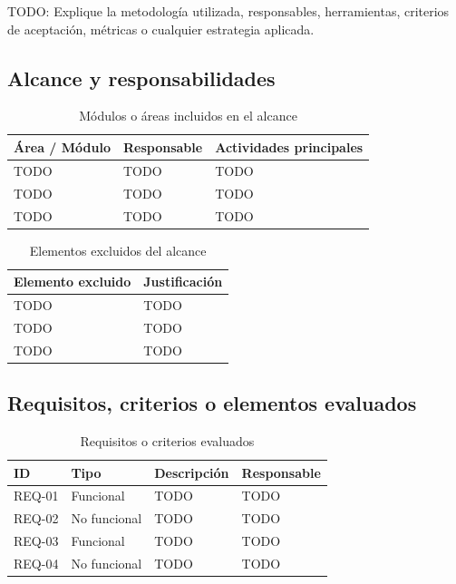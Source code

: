\documentclass[11pt,spanish]{article}
\begin{document}
TODO: Explique la metodología utilizada, responsables, herramientas, criterios de aceptación, métricas o cualquier estrategia aplicada.

\subsection{Alcance y responsabilidades}

\begin{table}[H]
\centering
\caption{Módulos o áreas incluidos en el alcance}
\label{tab:alcance-incluido}
\begin{tabularx}{\textwidth}{p{4.2cm} p{3cm} Y}
\toprule
\textbf{Área / Módulo} & \textbf{Responsable} & \textbf{Actividades principales} \\
\midrule
TODO & TODO & TODO \\
TODO & TODO & TODO \\
TODO & TODO & TODO \\
\bottomrule
\end{tabularx}
\end{table}

\begin{table}[H]
\centering
\caption{Elementos excluidos del alcance}
\label{tab:alcance-excluido}
\begin{tabularx}{\textwidth}{p{4.5cm} Y}
\toprule
\textbf{Elemento excluido} & \textbf{Justificación} \\
\midrule
TODO & TODO \\
TODO & TODO \\
TODO & TODO \\
\bottomrule
\end{tabularx}
\end{table}

\subsection{Requisitos, criterios o elementos evaluados}

\begin{table}[H]
\centering
\caption{Requisitos o criterios evaluados}
\label{tab:requisitos}
\begin{tabularx}{\textwidth}{p{1.8cm} p{2.6cm} Y p{2.7cm}}
\toprule
\textbf{ID} & \textbf{Tipo} & \textbf{Descripción} & \textbf{Responsable} \\
\midrule
REQ-01 & Funcional & TODO & TODO \\
REQ-02 & No funcional & TODO & TODO \\
REQ-03 & Funcional & TODO & TODO \\
REQ-04 & No funcional & TODO & TODO \\
\bottomrule
\end{tabularx}
\end{table}
\end{document}
